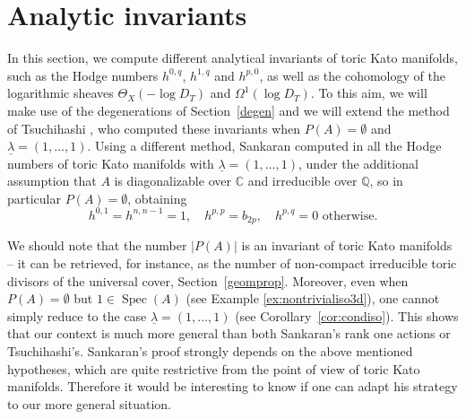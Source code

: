 \documentclass[JEP,XML,SOM,Unicode,NoFloatCountersInSection]{cedram}
\theoremstyle{definition}
\newcommand{\CC}{\mathbb{C}}
\newcommand{\QQ}{\mathbb{Q}}
\DeclareMathOperator{\Spec}{Spec}
\begin{document}
\section{Analytic invariants}\label{analytic}

In this section, we compute different analytical invariants of toric Kato manifolds, such as the Hodge numbers $h^{0,q}$, $h^{1,q}$ and $h^{p,0}$, as well as the cohomology of the logarithmic sheaves $\Theta_X(-\log D_T)$ and $\Omega^1(\log D_T)$. To this aim, we will make use of the degenerations of Section~\ref{degen} and we will extend the method of Tsuchihashi \cite{tsu}, who computed these invariants when $P(A)=\emptyset$ and $\underline\lambda=(1,\ldots, 1)$. Using a different method, Sankaran computed in \cite{san} all the Hodge numbers of toric Kato manifolds with $\underline\lambda=(1,\ldots, 1)$, under the additional assumption that $A$ is diagonalizable over $\CC$ and irreducible over $\QQ$, so in particular $P(A)=\emptyset$, obtaining
\[
h^{0,1}=h^{n,n-1}=1, \quad h^{p,p}=b_{2p}, \quad h^{p,q}=0 \text{ otherwise}.\]

We should note that the number $|P(A)|$ is an invariant of toric Kato manifolds -- it can be retrieved, for instance, as the number of non-compact irreducible toric divisors of the universal cover, \cf Section~\ref{geomprop}. Moreover, even when $P(A)=\emptyset$ but $1\in\Spec(A)$ (see Example \ref{ex:nontrivialiso3d}), one cannot simply reduce to the case $\underline\lambda=(1,\ldots, 1)$ (see Corollary~\ref{cor:condiso}). This shows that our context is much more general than both Sankaran's rank one actions or Tsuchihashi's.
Sankaran's proof strongly depends on the above mentioned hypotheses, which are quite restrictive from the point of view of toric Kato manifolds. Therefore it would be interesting to know if one can adapt his strategy to our more general situation.
\end{document}
